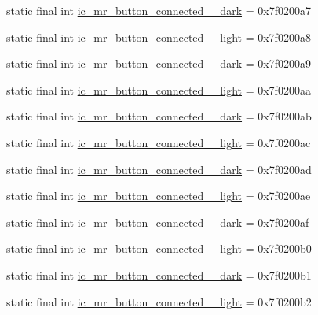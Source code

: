 \begin{CompactItemize}
\item 
static final int \hyperlink{classandroid_1_1support_1_1v4_1_1_r_1_1drawable_f5d40a0ff631af4ccf15b6996eb5c6b3}{ic\_\-mr\_\-button\_\-connected\_\_\-dark} = 0x7f0200a7
\item 
static final int \hyperlink{classandroid_1_1support_1_1v4_1_1_r_1_1drawable_c7109872078273e699285d3c3fe3d612}{ic\_\-mr\_\-button\_\-connected\_\_\-light} = 0x7f0200a8
\item 
static final int \hyperlink{classandroid_1_1support_1_1v4_1_1_r_1_1drawable_559de48c6d3bba61a4e88d8e590ed80c}{ic\_\-mr\_\-button\_\-connected\_\_\-dark} = 0x7f0200a9
\item 
static final int \hyperlink{classandroid_1_1support_1_1v4_1_1_r_1_1drawable_bbe3e10ed34033f4727c1e9f03e2af89}{ic\_\-mr\_\-button\_\-connected\_\_\-light} = 0x7f0200aa
\item 
static final int \hyperlink{classandroid_1_1support_1_1v4_1_1_r_1_1drawable_a93580d7abfce41e29e0c53e4aba107f}{ic\_\-mr\_\-button\_\-connected\_\_\-dark} = 0x7f0200ab
\item 
static final int \hyperlink{classandroid_1_1support_1_1v4_1_1_r_1_1drawable_39072a39ea0d99135559b5cf2d02e02d}{ic\_\-mr\_\-button\_\-connected\_\_\-light} = 0x7f0200ac
\item 
static final int \hyperlink{classandroid_1_1support_1_1v4_1_1_r_1_1drawable_52bd501e4e6ef111914e429f4bf4de6c}{ic\_\-mr\_\-button\_\-connected\_\_\-dark} = 0x7f0200ad
\item 
static final int \hyperlink{classandroid_1_1support_1_1v4_1_1_r_1_1drawable_eb64d793c1f9e359cd5f249ad6252292}{ic\_\-mr\_\-button\_\-connected\_\_\-light} = 0x7f0200ae
\item 
static final int \hyperlink{classandroid_1_1support_1_1v4_1_1_r_1_1drawable_aeb1f847feb1be2bd1792b3c7399d034}{ic\_\-mr\_\-button\_\-connected\_\_\-dark} = 0x7f0200af
\item 
static final int \hyperlink{classandroid_1_1support_1_1v4_1_1_r_1_1drawable_2b9eba0b88003b9a96c8c31a47a7d399}{ic\_\-mr\_\-button\_\-connected\_\_\-light} = 0x7f0200b0
\item 
static final int \hyperlink{classandroid_1_1support_1_1v4_1_1_r_1_1drawable_aafdf819e2c4c7259d2a138b1704384b}{ic\_\-mr\_\-button\_\-connected\_\_\-dark} = 0x7f0200b1
\item 
static final int \hyperlink{classandroid_1_1support_1_1v4_1_1_r_1_1drawable_9d64158be72c13b1e86ad20c99e6d5ab}{ic\_\-mr\_\-button\_\-connected\_\_\-light} = 0x7f0200b2

\end{CompactItemize}

